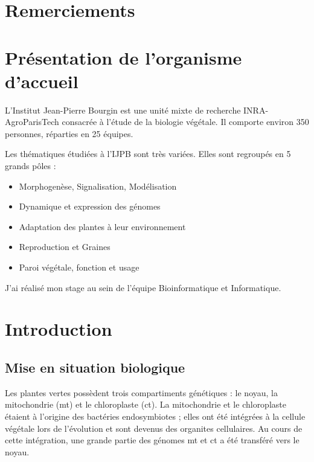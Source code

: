 \documentclass[a4paper]{article}
\begin{document}
\section*{Remerciements}

\newpage

\renewcommand{\contentsname}{Table des matières} 

\cleardoublepage
\pdfbookmark{\contentsname}{toc}
\tableofcontents

\listoftodos

\newpage

\section{Présentation de l'organisme d'accueil}

L'Institut Jean-Pierre Bourgin est une unité mixte de recherche INRA-AgroParisTech consacrée à l'étude de la biologie végétale. Il comporte environ 350 personnes, réparties en 25 équipes.

Les thématiques étudiées à l'IJPB sont très variées. Elles sont regroupés en 5 grands pôles : 
\begin{itemize}
\item Morphogenèse, Signalisation, Modélisation 
\item Dynamique et expression des génomes 
\item Adaptation des plantes à leur environnement 
\item Reproduction et Graines 
\item Paroi végétale, fonction et usage
\end{itemize}

J'ai réalisé mon stage au sein de l'équipe Bioinformatique et Informatique. 


\section{Introduction}

\subsection{Mise en situation biologique}

Les plantes vertes possèdent trois compartiments génétiques : le noyau, la mitochondrie (mt) et le chloroplaste (ct). La mitochondrie et le chloroplaste étaient à l'origine des bactéries endosymbiotes ; elles ont été intégrées à la cellule végétale lors de l'évolution et sont devenus des organites cellulaires. Au cours de cette intégration, une grande partie des génomes mt et ct a été transféré vers le noyau. 
\end{document}
